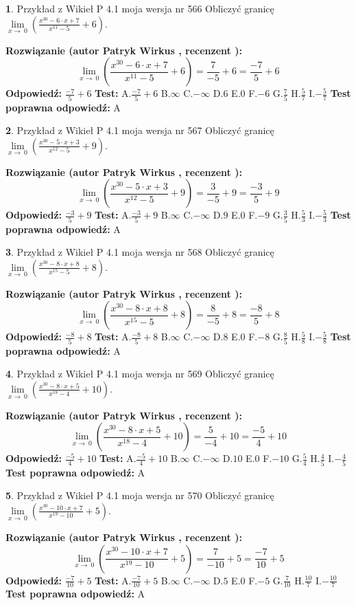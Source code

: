 \documentclass[12pt, a4paper]{article}
\theoremstyle{definition} %
\newtheorem{zad}{}
\newcommand{\zadStart}[1]{\begin{zad}#1\newline}
\newcommand{\zadStop}{\end{zad}}
\newcommand{\rozwStart}[2]{\noindent \textbf{Rozwiązanie (autor #1 , recenzent #2): }\newline}
\newcommand{\rozwStop}{\newline}
\newcommand{\odpStart}{\noindent \textbf{Odpowiedź:}\newline}
\newcommand{\odpStop}{\newline}
\newcommand{\testStart}{\noindent \textbf{Test:}\newline}
\newcommand{\testStop}{\newline}
\newcommand{\kluczStart}{\noindent \textbf{Test poprawna odpowiedź:}\newline}
\newcommand{\kluczStop}{\newline}
\begin{document}
\zadStart{Przykład z Wikieł P 4.1 moja wersja nr 566}
Obliczyć granicę $\lim\limits_{x\to\ 0}(\frac{x^{30}-6 \cdot x +7}{x^{11}-5}+6)$.
\zadStop
\rozwStart{Patryk Wirkus}{}
$$\lim\limits_{x\to\ 0}(\frac{x^{30}-6 \cdot x +7}{x^{11}-5}+6)=\frac{7}{-5}+6=\frac{-7}{5}+6$$
\rozwStop
\odpStart
$\frac{-7}{5}+6$
\odpStop
\testStart
A.$\frac{-7}{5}+6$
B.$\infty$
C.$-\infty$
D.$6$
E.$0$
F.$-6$
G.$\frac{7}{5}$
H.$\frac{5}{7}$
I.$-\frac{5}{7}$
\testStop
\kluczStart
A
\kluczStop



\zadStart{Przykład z Wikieł P 4.1 moja wersja nr 567}
Obliczyć granicę $\lim\limits_{x\to\ 0}(\frac{x^{30}-5 \cdot x +3}{x^{12}-5}+9)$.
\zadStop
\rozwStart{Patryk Wirkus}{}
$$\lim\limits_{x\to\ 0}(\frac{x^{30}-5 \cdot x +3}{x^{12}-5}+9)=\frac{3}{-5}+9=\frac{-3}{5}+9$$
\rozwStop
\odpStart
$\frac{-3}{5}+9$
\odpStop
\testStart
A.$\frac{-3}{5}+9$
B.$\infty$
C.$-\infty$
D.$9$
E.$0$
F.$-9$
G.$\frac{3}{5}$
H.$\frac{5}{3}$
I.$-\frac{5}{3}$
\testStop
\kluczStart
A
\kluczStop



\zadStart{Przykład z Wikieł P 4.1 moja wersja nr 568}
Obliczyć granicę $\lim\limits_{x\to\ 0}(\frac{x^{30}-8 \cdot x +8}{x^{15}-5}+8)$.
\zadStop
\rozwStart{Patryk Wirkus}{}
$$\lim\limits_{x\to\ 0}(\frac{x^{30}-8 \cdot x +8}{x^{15}-5}+8)=\frac{8}{-5}+8=\frac{-8}{5}+8$$
\rozwStop
\odpStart
$\frac{-8}{5}+8$
\odpStop
\testStart
A.$\frac{-8}{5}+8$
B.$\infty$
C.$-\infty$
D.$8$
E.$0$
F.$-8$
G.$\frac{8}{5}$
H.$\frac{5}{8}$
I.$-\frac{5}{8}$
\testStop
\kluczStart
A
\kluczStop



\zadStart{Przykład z Wikieł P 4.1 moja wersja nr 569}
Obliczyć granicę $\lim\limits_{x\to\ 0}(\frac{x^{30}-8 \cdot x +5}{x^{18}-4}+10)$.
\zadStop
\rozwStart{Patryk Wirkus}{}
$$\lim\limits_{x\to\ 0}(\frac{x^{30}-8 \cdot x +5}{x^{18}-4}+10)=\frac{5}{-4}+10=\frac{-5}{4}+10$$
\rozwStop
\odpStart
$\frac{-5}{4}+10$
\odpStop
\testStart
A.$\frac{-5}{4}+10$
B.$\infty$
C.$-\infty$
D.$10$
E.$0$
F.$-10$
G.$\frac{5}{4}$
H.$\frac{4}{5}$
I.$-\frac{4}{5}$
\testStop
\kluczStart
A
\kluczStop



\zadStart{Przykład z Wikieł P 4.1 moja wersja nr 570}
Obliczyć granicę $\lim\limits_{x\to\ 0}(\frac{x^{30}-10 \cdot x +7}{x^{19}-10}+5)$.
\zadStop
\rozwStart{Patryk Wirkus}{}
$$\lim\limits_{x\to\ 0}(\frac{x^{30}-10 \cdot x +7}{x^{19}-10}+5)=\frac{7}{-10}+5=\frac{-7}{10}+5$$
\rozwStop
\odpStart
$\frac{-7}{10}+5$
\odpStop
\testStart
A.$\frac{-7}{10}+5$
B.$\infty$
C.$-\infty$
D.$5$
E.$0$
F.$-5$
G.$\frac{7}{10}$
H.$\frac{10}{7}$
I.$-\frac{10}{7}$
\testStop
\kluczStart
A
\kluczStop
\end{document}
